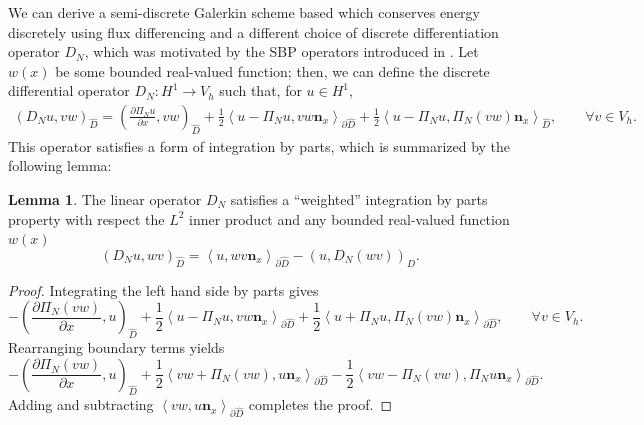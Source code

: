 \documentclass[preprint,10pt]{article}
\theoremstyle{definition}
\theoremstyle{lemma}
\newtheorem{lemma}{Lemma}
\theoremstyle{theorem}
\theoremstyle{assumption}
\newcommand{\pd}[2]{\frac{\partial#1}{\partial#2}}
\newcommand{\LRp}[1]{\left( #1 \right)}
\newcommand{\LRa}[1]{\left\langle #1 \right\rangle}
\begin{document}
We can derive a semi-discrete Galerkin scheme based which conserves energy discretely using flux differencing and a different choice of discrete differentiation operator $D_N$, which was motivated by the SBP operators introduced in \cite{chen2017entropy}.  Let $w(x)$ be some bounded real-valued function; then, we can define the discrete differential operator $D_N: H^1\rightarrow V_h$ such that, for $u\in H^1$, 
\begin{align}
\LRp{D_N u, vw}_{\widehat{D}} = \LRp{\pd{ \Pi_N u}{x},vw}_{\widehat{D}} + \frac{1}{2}{\LRa{{u - \Pi_N u}, vw\bm{n}_x}}_{\partial \widehat{D}} + \frac{1}{2}\LRa{u - \Pi_Nu ,\Pi_N\LRp{vw}\bm{n}_x }_{\widehat{D}}, \qquad \forall v\in V_h.
\label{eq:dgd}
\end{align}
This operator satisfies a form of integration by parts, which is summarized by the following lemma:
\begin{lemma}
\label{lemma:dgd_local}
The linear operator $D_N$ satisfies a ``weighted'' integration by parts property with respect the $L^2$ inner product and any bounded real-valued function $w(x)$ 
\[
\LRp{D_N u, wv}_{\widehat{D}} = \LRa{u,wv\bm{n}_x}_{\partial \widehat{D}} - \LRp{u,D_N (w v)}_{\widehat{D}}.
\]
\end{lemma}
\begin{proof}
Integrating the left hand side by parts gives
\[
-\LRp{\pd{ \Pi_N (vw)}{x},u}_{\widehat{D}} + \frac{1}{2}{\LRa{{u - \Pi_N u}, vw\bm{n}_x}}_{\partial \widehat{D}} + \frac{1}{2}\LRa{u + \Pi_Nu ,\Pi_N\LRp{vw}\bm{n}_x }_{\partial \widehat{D}}, \qquad \forall v\in V_h.
\]
Rearranging boundary terms yields
\[
-\LRp{\pd{ \Pi_N (vw)}{x},u}_{\widehat{D}} + \frac{1}{2}\LRa{vw + \Pi_N(vw) , u\bm{n}_x }_{\partial \widehat{D}}  - \frac{1}{2}\LRa{vw - \Pi_N (vw), \Pi_N u \bm{n}_x}_{\partial \widehat{D}}.  
\]
Adding and subtracting $\LRa{vw,u\bm{n}_x}_{\partial \widehat{D}}$ completes the proof.
\end{proof}
\end{document}
